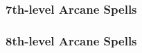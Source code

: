 \subsubsection{7th-level Arcane Spells}
\begin{swspelllist}

    \SLenergyconversion[Abjur]
    \SLspellturning
    \SLantimagicfield*

    \SLacidfog[Conj]
    \SLcloudkill
    \SLsummonmonstervii
    \SLdimensiondoormass*

    \SLmomentofprescience[Div]
    \SLreadmindgreater
    \SLprecognitiongreater*

    \SLconfusionmass[Ench]
    \SLdeepslumber
    \SLfeeblemind
    \SLheroismgreater
    \SLdominateperson*

    \SLenergyconversion[Evoc]
    \SLmissilestorm
    \SLshoutgreater
    \SLforcecage*

    \SLinvisibilitymass[Illus]
    \SLprojectimage
    \SLshadowbody
    \spellhead*{}

    \SLfingerofdeath[Necro]
    \SLinflictseriouswounds
    \SLpowerwordblind
    \SLstriptheflesh
    \SLlifebreakercurse*

    \SLblacktentacles[Trans]
    \SLcombattransformation
    \SLshadowbody
    \spellhead*{}

    \SLprismaticspray[Univ]
\end{swspelllist}

\subsubsection{8th-level Arcane Spells} 
\begin{swspelllist}

    \SLshadowumbra[Abjur]
    \SLspelltheftgreater*

    \SLseaoffog[Conj]
    \SLsummonmonsterviii
    \SLmaze*

    \SLprecognitiongreater[Div]
    \SLreadmindmass
    \SLrevelation*

    \SLholdpersonmass[Ench]
    \SLscintillatingpattern
    \SLpowerwordstun
    \SLsuggestionmass*

    \SLconeofcoldgreater[Evoc]
    \SLpolarray
    \spellhead{}
    \SLcrushinghand*

    \SLscintillatingpattern[Illus]
    \SLshadowumbra
    \spellhead*{}

    \SLenergydrain[Necro]
    \SLinflictcriticalwounds
    \SLwavesofexhaustion
    \SLhorridwilting*

    \SLironbody[Trans]
    \SLreversegravity
    \SLtemporalstasis
    \SLhastemass*
\end{swspelllist}

